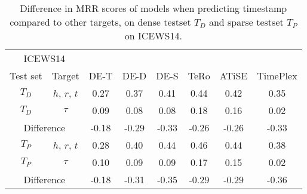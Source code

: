 \begin{table}[htb]
\centering
\begin{minipage}{\columnwidthcaption}
\centering
\caption{Difference in MRR scores of models when predicting timestamp compared to other targets, on dense testset $T_D$ and sparse testset $T_P$ on ICEWS14.}
\label{tab:time_density_timestamp_icews14}
\end{minipage}
\vspace{-3mm}

\begin{tabular}{cc|cccccc} \hline
\multicolumn{2}{c|}{ICEWS14} & & & & & & \\
Test set & Target & DE-T & DE-D & DE-S & TeRo & ATiSE & TimePlex \\ \hline 
$T_D$ & $h$, $r$, $t$ & 
0.27 & 0.37 & 0.41 & 0.44 & 0.42 & 0.35 \\
$T_D$ & $\tau$        & 
0.09 & 0.08 & 0.08 & 0.18 & 0.16 & 0.02 \\ \hline
\multicolumn{2}{c|}{Difference} & 
-0.18 & -0.29 & -0.33 & -0.26 & -0.26 & -0.33 \\ \hline\hline
$T_P$ & $h$, $r$, $t$ & 
0.28 & 0.40 & 0.44 & 0.46 & 0.44 & 0.38 \\
$T_P$ & $\tau$        & 
0.10 & 0.09 & 0.09 & 0.17 & 0.15 & 0.02 \\ \hline 
\multicolumn{2}{c|}{Difference} & 
-0.18 & -0.31 & -0.35 & -0.29 & -0.29 & -0.36 \\ \hline
\end{tabular}

\end{table}

